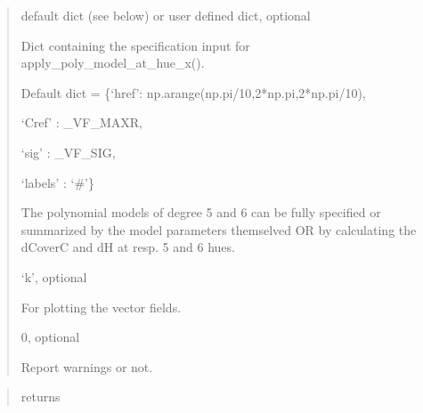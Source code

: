 \documentclass[letterpaper,10pt,english]{sphinxmanual}
\begin{document}
\begin{fulllineitems}
\begin{description}
\begin{quote}
\begin{description}
\item[{pcolorshift}] \leavevmode
\begin{DUlineblock}{0em}
\item[] default dict (see below) or user defined dict, optional
\item[] Dict containing the specification input 
for apply\_poly\_model\_at\_hue\_x().
\item[] Default dict = \{‘href’: np.arange(np.pi/10,2*np.pi,2*np.pi/10),
\item[]
\begin{DUlineblock}{\DUlineblockindent}
\item[] ‘Cref’ : \_VF\_MAXR, 
\item[] ‘sig’ : \_VF\_SIG, 
\item[] ‘labels’ : ‘\#’\} 
\end{DUlineblock}
\item[] The polynomial models of degree 5 and 6 can be fully specified or 
 summarized by the model parameters themselved OR by calculating the
dCoverC and dH at resp. 5 and 6 hues.
\end{DUlineblock}

\item[{vfcolor}] \leavevmode
\begin{DUlineblock}{0em}
\item[] ‘k’, optional
\item[] For plotting the vector fields.
\end{DUlineblock}

\item[{verbosity}] \leavevmode
\begin{DUlineblock}{0em}
\item[] 0, optional
\item[] Report warnings or not.
\end{DUlineblock}

\end{description}\end{quote}

\item[{Returns:}] \leavevmode\begin{quote}\begin{description}
\item[{returns}] \leavevmode
{}

\end{description}\end{quote}

\end{description}

\end{fulllineitems}
\end{document}

